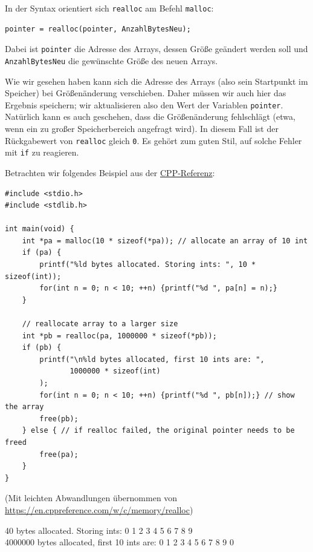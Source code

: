 In der Syntax orientiert sich \texttt{realloc} am Befehl \texttt{malloc}:

\begin{codebox}
\begin{verbatim}
pointer = realloc(pointer, AnzahlBytesNeu);
\end{verbatim}
\end{codebox}

Dabei ist \texttt{pointer} die Adresse des Arrays, dessen Größe geändert werden soll und \texttt{AnzahlBytesNeu} die gewünschte Größe des neuen Arrays.

Wie wir gesehen haben kann sich die Adresse des Arrays (also sein Startpunkt im Speicher) bei Größenänderung verschieben. Daher müssen wir auch hier das Ergebnis speichern; wir aktualisieren also den Wert der Variablen \texttt{pointer}. Natürlich kann es auch geschehen, dass die Größenänderung fehlschlägt (etwa, wenn ein zu großer Speicherbereich angefragt wird). In diesem Fall ist der Rückgabewert von \texttt{realloc} gleich \texttt{0}. Es gehört zum guten Stil, auf solche Fehler mit \texttt{if} zu reagieren.

Betrachten wir folgendes Beispiel aus der \href{https://en.cppreference.com/w/c/memory/realloc}{CPP-Referenz}:

\begin{codebox}
\begin{verbatim}
#include <stdio.h>
#include <stdlib.h>
 
int main(void) {
    int *pa = malloc(10 * sizeof(*pa)); // allocate an array of 10 int
    if (pa) {
        printf("%ld bytes allocated. Storing ints: ", 10 * sizeof(int));
        for(int n = 0; n < 10; ++n) {printf("%d ", pa[n] = n);}
    }
    
    // reallocate array to a larger size
    int *pb = realloc(pa, 1000000 * sizeof(*pb)); 
    if (pb) {
        printf("\n%ld bytes allocated, first 10 ints are: ", 
               1000000 * sizeof(int)
        );
        for(int n = 0; n < 10; ++n) {printf("%d ", pb[n]);} // show the array
        free(pb);
    } else { // if realloc failed, the original pointer needs to be freed
        free(pa);
    }
}
\end{verbatim}
{\normalfont(Mit leichten Abwandlungen übernommen von \url{https://en.cppreference.com/w/c/memory/realloc})}
\end{codebox}

\begin{cmdbox}
40 bytes allocated. Storing ints: 0 1 2 3 4 5 6 7 8 9 \\
4000000 bytes allocated, first 10 ints are: 0 1 2 3 4 5 6 7 8 9 0
\end{cmdbox}

